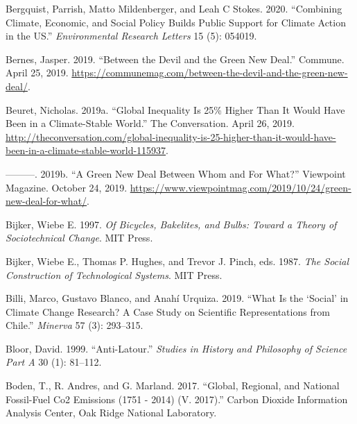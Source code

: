 \documentclass[a4paper, nobind]{templates/ociamthesis}
\newlength{\cslhangindent}
\newenvironment{CSLReferences}[2] %
 {%
  \setlength{\parindent}{0pt}
  \ifodd #1
  \let\oldpar\par
  \def\par{\hangindent=\cslhangindent\oldpar}
  \fi
  \setlength{\parskip}{1mm}
  \setlength{\baselineskip}{6mm}
 }%
 {}
\begin{document}
\begin{CSLReferences}{1}{0}
\leavevmode{}%
Bergquist, Parrish, Matto Mildenberger, and Leah C Stokes. 2020. {``Combining Climate, Economic, and Social Policy Builds Public Support for Climate Action in the {US}.''} \emph{Environmental Research Letters} 15 (5): 054019.

\leavevmode{}%
Bernes, Jasper. 2019. {``Between the {Devil} and the {Green New Deal}.''} {Commune}. April 25, 2019. \url{https://communemag.com/between-the-devil-and-the-green-new-deal/}.

\leavevmode{}%
Beuret, Nicholas. 2019a. {``Global Inequality Is 25\% Higher Than It Would Have Been in a Climate-Stable World.''} {The Conversation}. April 26, 2019. \url{http://theconversation.com/global-inequality-is-25-higher-than-it-would-have-been-in-a-climate-stable-world-115937}.

\leavevmode{}%
---------. 2019b. {``A {Green New Deal Between Whom} and {For What}?''} {Viewpoint Magazine}. October 24, 2019. \url{https://www.viewpointmag.com/2019/10/24/green-new-deal-for-what/}.

\leavevmode{}%
Bijker, Wiebe E. 1997. \emph{Of {Bicycles}, {Bakelites}, and {Bulbs}: {Toward} a {Theory} of {Sociotechnical Change}}. {MIT Press}.

\leavevmode{}%
Bijker, Wiebe E., Thomas P. Hughes, and Trevor J. Pinch, eds. 1987. \emph{The {Social Construction} of {Technological Systems}}. {MIT Press}.

\leavevmode{}%
Billi, Marco, Gustavo Blanco, and Anahí Urquiza. 2019. {``What Is the {`{Social}'} in {Climate Change Research}? {A Case Study} on {Scientific Representations} from {Chile}.''} \emph{Minerva} 57 (3): 293--315.

\leavevmode{}%
Bloor, David. 1999. {``Anti-{Latour}.''} \emph{Studies in History and Philosophy of Science Part A} 30 (1): 81--112.

\leavevmode{}%
Boden, T., R. Andres, and G. Marland. 2017. {``Global, {Regional}, and {National Fossil-Fuel Co2 Emissions} (1751 - 2014) ({V}. 2017).''} {Carbon Dioxide Information Analysis Center, Oak Ridge National Laboratory}.


\end{CSLReferences}
\end{document}
